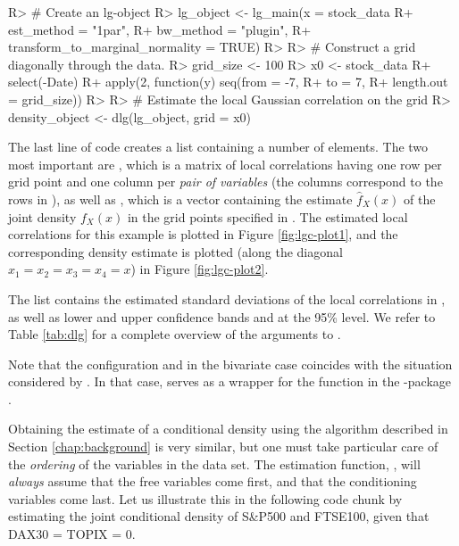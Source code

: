 \begin{example}
R> # Create an lg-object
R> lg_object <- lg_main(x = stock_data %
R+                      est_method = "1par",
R+                      bw_method = "plugin",
R+                      transform_to_marginal_normality = TRUE)
R> 
R> # Construct a grid diagonally through the data.
R> grid_size <- 100
R> x0 <- stock_data %
R+   select(-Date) %
R+   apply(2, function(y) seq(from = -7,
R+                            to = 7,
R+                            length.out = grid_size))
R> 
R> # Estimate the local Gaussian correlation on the grid
R> density_object <- dlg(lg_object, grid = x0)
\end{example}
The last line of code creates a list containing a number of elements. The two most important are , which is a matrix of local correlations having one row per grid point and one column per \emph{pair of variables} (the columns correspond to the rows in ), as well as , which is a vector containing the estimate \(\widehat f_X(x)\) of the joint density \(f_X(x)\) in the grid points specified in . The estimated local correlations for this example is plotted in Figure \ref{fig:lgc-plot1}, and the corresponding density estimate is plotted (along the diagonal \(x_1=x_2=x_3=x_4=x\)) in Figure \ref{fig:lgc-plot2}.

The list  contains the estimated standard deviations of the local correlations in , as well
as lower and upper confidence bands  and  at the 95\% level. We refer to Table \ref{tab:dlg} for a complete overview of the arguments to .

Note that the configuration  and  in the bivariate case coincides with the situation considered by \citet{tjos:huft:2013}. In that case,  serves as a wrapper for the function  in the -package \citep{bere:klep:tjos:2014}.

Obtaining the estimate of a conditional density using the \citet{otne:tjos:2018} algorithm described in Section \ref{chap:background} is very similar, but one must take particular care of the \emph{ordering} of the variables in the data set. The estimation function, , will \emph{always} assume that the free variables come first, and that the conditioning variables come last. Let us illustrate this in the following code chunk by estimating the joint conditional density of S\&P500 and FTSE100, given that DAX30 = TOPIX = 0.

